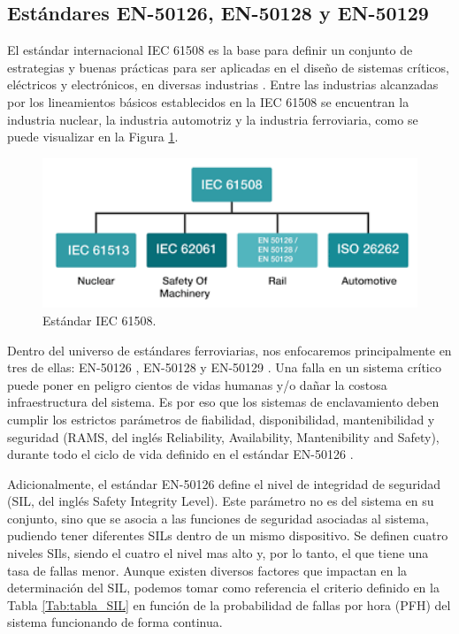 \subsection{Estándares EN-50126, EN-50128 y EN-50129}

    El estándar internacional IEC 61508 \cite{Paper_77,Paper_78,Paper_79,Paper_80,Paper_81,Paper_82,Paper_83} es la base para definir un conjunto de estrategias y buenas prácticas para ser aplicadas en el diseño de sistemas críticos, eléctricos y electrónicos, en diversas industrias \cite{Paper_26,Paper_29,Paper_30,Paper_31,Paper_34,Paper_47} . Entre las industrias alcanzadas por los lineamientos básicos establecidos en la IEC 61508 se encuentran la industria nuclear, la industria automotriz y la industria ferroviaria, como se puede visualizar en la Figura \ref{fig:IEC_61508}.

    \begin{figure}[h]
        \centering
        \includegraphics[width=1\textwidth]{Figuras/IEC61508.png}
        \centering\caption{Estándar IEC 61508.}
        \label{fig:IEC_61508}
    \end{figure}

    Dentro del universo de estándares ferroviarias, nos enfocaremos principalmente en tres de ellas: EN-50126 \cite{Paper_70,Paper_71,Paper_72,Paper_73,Paper_74}, EN-50128 \cite{Paper_75,Paper_74} y EN-50129 \cite{Paper_76,Paper_73}. Una falla en un sistema crítico puede poner en peligro cientos de vidas humanas y/o dañar la costosa infraestructura del sistema. Es por eso que los sistemas de enclavamiento deben cumplir los estrictos parámetros de fiabilidad, disponibilidad, mantenibilidad y seguridad (RAMS, del inglés Reliability, Availability, Mantenibility and Safety), durante todo el ciclo de vida definido en el estándar EN-50126 \cite{Paper_70,Paper_66,Paper_84}.

    Adicionalmente, el estándar EN-50126 define el nivel de integridad de seguridad (SIL, del inglés Safety Integrity Level). Este parámetro no es del sistema en su conjunto, sino que se asocia a las funciones de seguridad asociadas al sistema, pudiendo tener diferentes SILs dentro de un mismo dispositivo. Se definen cuatro niveles SIls, siendo el cuatro el nivel mas alto y, por lo tanto, el que tiene una tasa de fallas menor. Aunque existen diversos factores que impactan en la determinación del SIL, podemos tomar como referencia el criterio definido en la Tabla \ref{Tab:tabla_SIL} en función de la probabilidad de fallas por hora (PFH) del sistema funcionando de forma continua.

